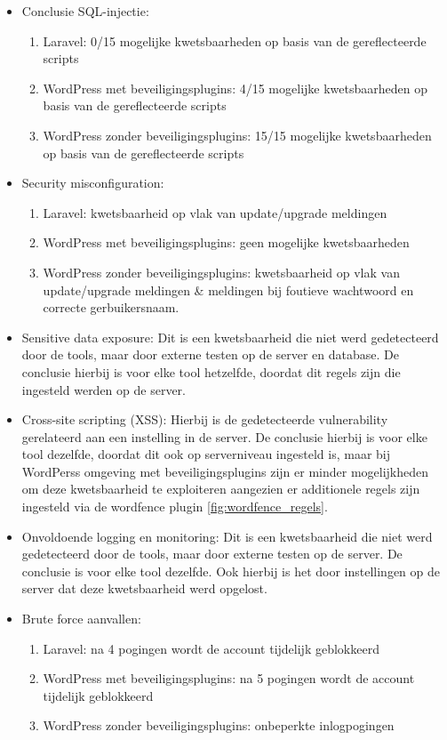   \begin{itemize}
    \item Conclusie SQL-injectie:
    \begin{enumerate}
      \item Laravel: 0/15 mogelijke kwetsbaarheden op basis van de gereflecteerde scripts
      \item WordPress met beveiligingsplugins: 4/15 mogelijke kwetsbaarheden op basis van de gereflecteerde scripts
      \item WordPress zonder beveiligingsplugins: 15/15 mogelijke kwetsbaarheden op basis van de gereflecteerde scripts
    \end{enumerate}
    \item Security misconfiguration:
    \begin{enumerate}
      \item Laravel: kwetsbaarheid op vlak van update/upgrade meldingen
      \item WordPress met beveiligingsplugins: geen mogelijke kwetsbaarheden
      \item WordPress zonder beveiligingsplugins: kwetsbaarheid op vlak van update/upgrade meldingen \& meldingen bij 
            foutieve wachtwoord en correcte gerbuikersnaam.
    \end{enumerate}
    \item Sensitive data exposure: Dit is een kwetsbaarheid die niet werd gedetecteerd door de tools, maar door 
          externe testen op de server en database. De conclusie hierbij is voor elke tool hetzelfde, doordat dit 
          regels zijn die ingesteld werden op de server.
    \item Cross-site scripting (XSS): Hierbij is de gedetecteerde vulnerability gerelateerd aan een instelling in de 
          server. De conclusie hierbij is voor elke tool dezelfde, doordat dit ook op serverniveau ingesteld is, maar bij WordPerss omgeving met beveiligingsplugins 
          zijn er minder mogelijkheden om deze kwetsbaarheid te exploiteren aangezien er additionele regels zijn ingesteld 
          via de wordfence plugin \ref{fig:wordfence_regels}.
    \item Onvoldoende logging en monitoring: Dit is een kwetsbaarheid die niet werd gedetecteerd door de tools, maar door 
          externe testen op de server. De conclusie is voor elke tool dezelfde. Ook hierbij is het door instellingen 
          op de server dat deze kwetsbaarheid werd opgelost.
    \item Brute force aanvallen:
    \begin{enumerate}
      \item Laravel: na 4 pogingen wordt de account tijdelijk geblokkeerd
      \item WordPress met beveiligingsplugins: na 5 pogingen wordt de account tijdelijk geblokkeerd
      \item WordPress zonder beveiligingsplugins: onbeperkte inlogpogingen
    \end{enumerate}
  \end{itemize}


